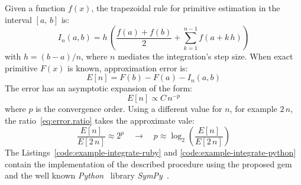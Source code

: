 Given a function $f(x)$, the trapezoidal rule for primitive estimation in the interval $[a,\,b]$ is:
\begin{equation}
  I_{n}(a, b) = h\, \left( \dfrac{f(a) + f(b)}{2} +
    \sum\limits_{k = 1}^{n - 1}{f \left( a + k \,h \right)} \right)
\end{equation}
with $h = (b - a) / n $, where $n$ mediates the integration's step size. When exact primitive $F(x)$ is known, approximation error is:
\begin{equation}
  E[n] = F(b) - F(a) - I_{n}(a, b)
\end{equation}
The error has an asymptotic expansion of the form:
\begin{equation}
  E[n] \propto C\,{n}^{-p}
\end{equation}
where $p$ is the convergence order. Using a different value for $n$, for example $2\,n$, the ratio~\ref{eq:error.ratio} takes the approximate vale:
\begin{equation}
  \label{eq:error.ratio}
  \dfrac{E[n]}{E[2\,n]} \approx 2^{p} \quad \rightarrow \quad p \approx \log_2 \left( \dfrac{E[n]}{E[2\,n]} \right)
\end{equation}
The Listings~\ref{code:example-integrate-ruby} and \ref{code:example-integrate-python} contain the implementation of the described procedure using the proposed gem and the well known \emph{Python}~\cite{van2011python} library \emph{SymPy}~\cite{christopher_smith_2016_47274}.

\noindent%
\begin{minipage}{.5\textwidth}

\end{minipage}\hfill
\begin{minipage}{.5\textwidth}

\end{minipage}

